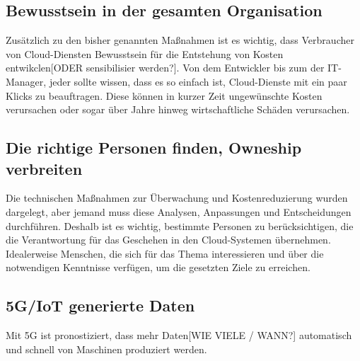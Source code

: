 \subsection*{Bewusstsein in der gesamten Organisation}
Zusätzlich zu den bisher genannten Maßnahmen ist es wichtig, dass Verbraucher von Cloud-Diensten Bewusstsein für die Entstehung von Kosten entwikclen[ODER sensibilisier werden?]. Von dem Entwickler bis zum der IT-Manager, jeder sollte wissen, dass es so einfach ist, Cloud-Dienste mit ein paar Klicks zu beauftragen. Diese können in kurzer Zeit ungewünschte  Kosten verursachen oder sogar über Jahre hinweg wirtschaftliche Schäden verursachen. 
\\
\subsection*{Die richtige Personen finden, Owneship verbreiten}
Die technischen Maßnahmen zur Überwachung und Kostenreduzierung wurden dargelegt, aber jemand muss diese Analysen, Anpassungen und Entscheidungen durchführen. 
Deshalb ist es wichtig, bestimmte Personen zu berücksichtigen, die die Verantwortung für das Geschehen in den Cloud-Systemen übernehmen. Idealerweise Menschen, die sich für das Thema interessieren und über die notwendigen Kenntnisse verfügen, um die gesetzten Ziele zu erreichen. 
\\
\subsection*{5G/IoT generierte Daten}
Mit 5G ist pronostiziert, dass mehr Daten[WIE VIELE / WANN?] automatisch und schnell von Maschinen produziert werden.
\\
